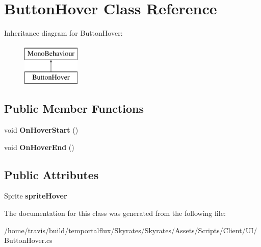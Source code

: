 \hypertarget{class_button_hover}{\section{Button\-Hover Class Reference}
\label{class_button_hover}
}
Inheritance diagram for Button\-Hover\-:\begin{figure}[H]
\begin{center}
\leavevmode
\includegraphics[height=2.000000cm]{class_button_hover}
\end{center}
\end{figure}
\subsection*{Public Member Functions}
\begin{DoxyCompactItemize}
\item 
\hypertarget{class_button_hover_a952a23c6f74d0ac34a5e303a8969e3e0}{void {\bfseries On\-Hover\-Start} ()}\label{class_button_hover_a952a23c6f74d0ac34a5e303a8969e3e0}

\item 
\hypertarget{class_button_hover_a5e25b6aa321dacef0edf1690bb1d6df6}{void {\bfseries On\-Hover\-End} ()}\label{class_button_hover_a5e25b6aa321dacef0edf1690bb1d6df6}

\end{DoxyCompactItemize}
\subsection*{Public Attributes}
\begin{DoxyCompactItemize}
\item 
\hypertarget{class_button_hover_a3009c8204783d0b70e684e67b13b2f61}{Sprite {\bfseries sprite\-Hover}}\label{class_button_hover_a3009c8204783d0b70e684e67b13b2f61}

\end{DoxyCompactItemize}


The documentation for this class was generated from the following file\-:\begin{DoxyCompactItemize}
\item 
/home/travis/build/temportalflux/\-Skyrates/\-Skyrates/\-Assets/\-Scripts/\-Client/\-U\-I/Button\-Hover.\-cs\end{DoxyCompactItemize}
